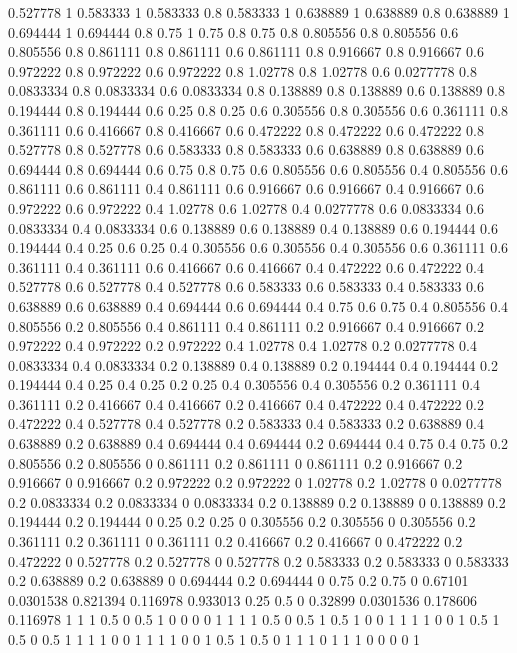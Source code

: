 0.527778 1
0.583333 1
0.583333 0.8
0.583333 1
0.638889 1
0.638889 0.8
0.638889 1
0.694444 1
0.694444 0.8
0.75 1
0.75 0.8
0.75 0.8
0.805556 0.8
0.805556 0.6
0.805556 0.8
0.861111 0.8
0.861111 0.6
0.861111 0.8
0.916667 0.8
0.916667 0.6
0.972222 0.8
0.972222 0.6
0.972222 0.8
1.02778 0.8
1.02778 0.6
0.0277778 0.8
0.0833334 0.8
0.0833334 0.6
0.0833334 0.8
0.138889 0.8
0.138889 0.6
0.138889 0.8
0.194444 0.8
0.194444 0.6
0.25 0.8
0.25 0.6
0.305556 0.8
0.305556 0.6
0.361111 0.8
0.361111 0.6
0.416667 0.8
0.416667 0.6
0.472222 0.8
0.472222 0.6
0.472222 0.8
0.527778 0.8
0.527778 0.6
0.583333 0.8
0.583333 0.6
0.638889 0.8
0.638889 0.6
0.694444 0.8
0.694444 0.6
0.75 0.8
0.75 0.6
0.805556 0.6
0.805556 0.4
0.805556 0.6
0.861111 0.6
0.861111 0.4
0.861111 0.6
0.916667 0.6
0.916667 0.4
0.916667 0.6
0.972222 0.6
0.972222 0.4
1.02778 0.6
1.02778 0.4
0.0277778 0.6
0.0833334 0.6
0.0833334 0.4
0.0833334 0.6
0.138889 0.6
0.138889 0.4
0.138889 0.6
0.194444 0.6
0.194444 0.4
0.25 0.6
0.25 0.4
0.305556 0.6
0.305556 0.4
0.305556 0.6
0.361111 0.6
0.361111 0.4
0.361111 0.6
0.416667 0.6
0.416667 0.4
0.472222 0.6
0.472222 0.4
0.527778 0.6
0.527778 0.4
0.527778 0.6
0.583333 0.6
0.583333 0.4
0.583333 0.6
0.638889 0.6
0.638889 0.4
0.694444 0.6
0.694444 0.4
0.75 0.6
0.75 0.4
0.805556 0.4
0.805556 0.2
0.805556 0.4
0.861111 0.4
0.861111 0.2
0.916667 0.4
0.916667 0.2
0.972222 0.4
0.972222 0.2
0.972222 0.4
1.02778 0.4
1.02778 0.2
0.0277778 0.4
0.0833334 0.4
0.0833334 0.2
0.138889 0.4
0.138889 0.2
0.194444 0.4
0.194444 0.2
0.194444 0.4
0.25 0.4
0.25 0.2
0.25 0.4
0.305556 0.4
0.305556 0.2
0.361111 0.4
0.361111 0.2
0.416667 0.4
0.416667 0.2
0.416667 0.4
0.472222 0.4
0.472222 0.2
0.472222 0.4
0.527778 0.4
0.527778 0.2
0.583333 0.4
0.583333 0.2
0.638889 0.4
0.638889 0.2
0.638889 0.4
0.694444 0.4
0.694444 0.2
0.694444 0.4
0.75 0.4
0.75 0.2
0.805556 0.2
0.805556 0
0.861111 0.2
0.861111 0
0.861111 0.2
0.916667 0.2
0.916667 0
0.916667 0.2
0.972222 0.2
0.972222 0
1.02778 0.2
1.02778 0
0.0277778 0.2
0.0833334 0.2
0.0833334 0
0.0833334 0.2
0.138889 0.2
0.138889 0
0.138889 0.2
0.194444 0.2
0.194444 0
0.25 0.2
0.25 0
0.305556 0.2
0.305556 0
0.305556 0.2
0.361111 0.2
0.361111 0
0.361111 0.2
0.416667 0.2
0.416667 0
0.472222 0.2
0.472222 0
0.527778 0.2
0.527778 0
0.527778 0.2
0.583333 0.2
0.583333 0
0.583333 0.2
0.638889 0.2
0.638889 0
0.694444 0.2
0.694444 0
0.75 0.2
0.75 0
0.67101 0.0301538
0.821394 0.116978
0.933013 0.25
0.5 0
0.32899 0.0301536
0.178606 0.116978
1 1
1 0.5
0 0.5
1 0
0 0
0 1
1 1
1 0.5
0 0.5
1 0.5
1 0
0 1
1 1
1 0
0 1
0.5 1
0.5 0
0.5 1
1 1
1 0
0 1
1 1
1 0
0 1
0.5 1
0.5 0
1 1
1 0
1 1
1 0
0 0
0 1
